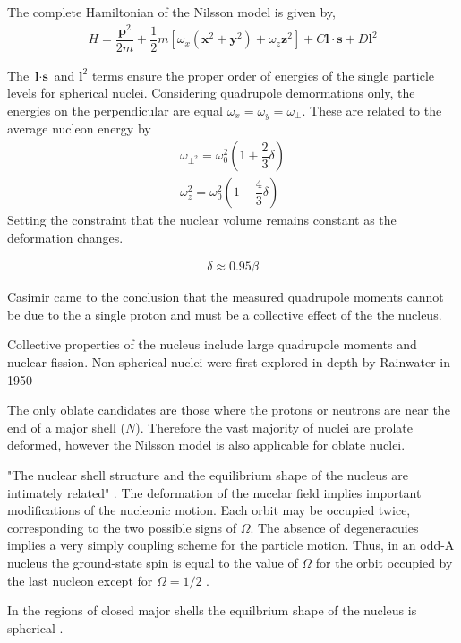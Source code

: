 \documentclass[8pt,a4paper, twoside]{report}
\begin{document}
The complete Hamiltonian of the Nilsson model is given by,
\begin{align}
H = \dfrac{\textbf{p}^2}{2m} + \dfrac{1}{2}m \left[\omega_x\left(\textbf{x}^2 + \textbf{y}^2\right) + \omega_z \textbf{z}^2\right] + C\textbf{l}\cdot \textbf{s} + D \textbf{l}^2
\end{align}

The $\textbf{l}\cdot \textbf{s}$ and $\textbf{l}^2$ terms ensure the proper order of energies of the single particle levels for spherical nuclei. Considering quadrupole demormations only, the energies on the perpendicular are equal $\omega_x = \omega_y = \omega_{\perp}$. These are related to the average nucleon energy by 
\begin{align*}
\omega_{\perp^{2}} = \omega_0^2\left(1 + \dfrac{2}{3}\delta\right) \\
\omega_z^2 = \omega_0^2\left(1 - \dfrac{4}{3}\delta\right)
\end{align*}
Setting the constraint that the nuclear volume remains constant as the deformation changes.

\begin{align*}
\delta \approx 0.95 \beta
\end{align*}

Casimir came to the conclusion that the measured quadrupole moments cannot be due to the a single proton and must be a collective effect of the the nucleus. 

Collective properties of the nucleus include large quadrupole moments and nuclear fission. Non-spherical nuclei were first explored in depth by Rainwater in 1950 \cite{Rainwater1950}

The only oblate candidates are those where the protons or neutrons  are near the end of a major shell ($N$). Therefore the vast majority of nuclei are prolate deformed, however the Nilsson model is also applicable for oblate nuclei.

"The nuclear shell structure and the equilibrium shape of the nucleus are intimately related" \cite{Mottelson1955}. The deformation of the nucelar field implies important modifications of the nucleonic motion. Each orbit may be occupied twice, corresponding to the two possible signs of $\Omega$. The absence of degeneracuies implies a very simply coupling scheme for the particle motion. Thus, in an odd-A nucleus the ground-state spin is equal to the value of $\Omega$ for the orbit occupied by the last nucleon except for $\Omega=1/2$ \cite{Nilsson1955}. 

In the regions of closed major shells the equilbrium shape of the nucleus is spherical \cite{Nilsson1955}. 
\end{document}
